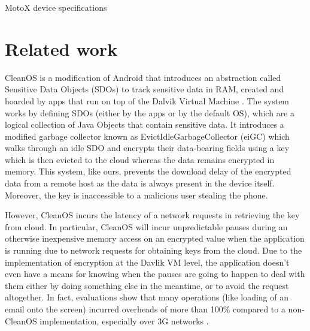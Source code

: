 \documentclass[conference,10pt]{IEEEtran}
\begin{document}
\begin{table}[]
\centering
\caption{MotoX device specifications}
\label{table:specs}
\end{table}




\section{Related work}
CleanOS is a modification of Android that introduces an abstraction called Sensitive Data Objects 
(SDOs) to track sensitive data in RAM, created and hoarded by apps that run on top of the Dalvik 
Virtual Machine \cite{cleanos}. The system works by defining SDOs (either by the apps or by the default OS), 
which are a logical collection of Java Objects that contain sensitive data. It introduces a modified 
garbage collector known as EvictIdleGarbageCollector (eiGC) which walks through an idle SDO and 
encrypts their data-bearing fields using a key which is then evicted to the cloud whereas the data 
remains encrypted in memory.  This system, like ours, prevents the download delay of the encrypted 
data from a remote host as the data is always present in the device itself. Moreover, the key is 
inaccessible to a malicious user stealing the phone.

However, CleanOS incurs the latency of a network requests in retrieving the key from cloud.  In 
particular, CleanOS will incur unpredictable pauses during an otherwise inexpensive memory access on 
an encrypted value when the application is running due to network requests for obtaining keys from 
the cloud. Due to the implementation of encryption at the Davlik VM level, the application doesn't 
even have a means for knowing when the pauses are going to happen to deal with them either by doing 
something else in the meantime, or to avoid the request altogether.  In fact, evaluations show that 
many operations (like loading of an email onto the screen) incurred overheads of more than 100\% 
compared to a non-CleanOS implementation, especially over 3G networks \cite{cleanos}.
\end{document}

